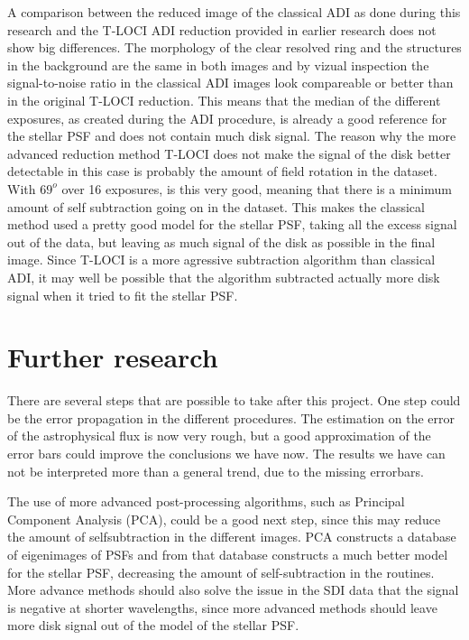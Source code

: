 \documentclass[twoside,single,12pt]{lion-msc}
\begin{document}
A comparison between the reduced image of the classical ADI as done during this research and the T-LOCI ADI reduction provided in earlier research does not show big differences. The morphology of the clear resolved ring and the structures in the background are the same in both images and by vizual inspection the signal-to-noise ratio in the classical ADI images look compareable or better than in the original T-LOCI reduction. This means that the median of the different exposures, as created during the ADI procedure, is already a good reference for the stellar PSF and does not contain much disk signal. The reason why the more advanced reduction method T-LOCI does not make the signal of the disk better detectable in this case is probably the amount of field rotation in the dataset. With $69^o$ over 16 exposures, is this very good, meaning that there is a minimum amount of self subtraction going on in the dataset. This makes the classical method used a pretty good model for the stellar PSF, taking all the excess signal out of the data, but leaving as much signal of the disk as possible in the final image. Since T-LOCI is a more agressive subtraction algorithm than classical ADI, it may well be possible that the algorithm subtracted actually more disk signal when it tried to fit the stellar PSF. 

\section{Further research}
There are several steps that are possible to take after this project. One step could be the error propagation in the different procedures. The estimation on the error of the astrophysical flux is now very rough, but a good approximation of the error bars could improve the conclusions we have now. The results we have can not be interpreted more than a general trend, due to the missing errorbars.
\bigskip

The use of more advanced post-processing algorithms, such as Principal Component Analysis (PCA), could be a good next step, since this may reduce the amount of selfsubtraction in the different images. PCA constructs a database of eigenimages of PSFs and from that database constructs a much better model for the stellar PSF, decreasing the amount of self-subtraction in the routines. More advance methods should also solve the issue in the SDI data that the signal is negative at shorter wavelengths, since more advanced methods should leave more disk signal out of the model of the stellar PSF.
\end{document}
